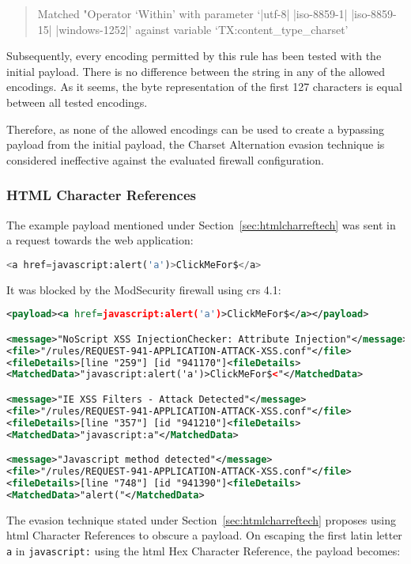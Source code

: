 \begin{quote}
	Matched "Operator `Within' with parameter `|utf-8| |iso-8859-1| |iso-8859-15| |windows-1252|' against variable `TX:content\_type\_charset'
\end{quote}
Subsequently, every encoding permitted by this rule has been tested with the initial payload. There is no difference between the string in any of the allowed encodings. As it seems, the byte representation of the first 127 characters is equal between all tested encodings. \cite{enc/diffa, enc/diffb, enc/diffc}

Therefore, as none of the allowed encodings can be used to create a bypassing payload from the initial payload, the Charset Alternation evasion technique is considered ineffective against the evaluated firewall configuration.


\subsubsection{HTML Character References}
\label{sec:htmlcharrefsingleeva}
The example payload mentioned under Section~\ref{sec:htmlcharreftech} was sent in a request towards the web application:

\begin{lstlisting}[style=basicStyle, language=Python]
<a href=javascript:alert('a')>ClickMeFor$</a>
\end{lstlisting}
It was blocked by the ModSecurity firewall using \acrshort{crs} 4.1:

\begin{lstlisting}[style=ruleStyle, language=XML, caption={<a\ href=javascript:alert('a')>ClickMeFor\$</a> blocked}, label={lst:storedxssinjblocked}]
<payload><a href=javascript:alert('a')>ClickMeFor$</a></payload>

<message>"NoScript XSS InjectionChecker: Attribute Injection"</message>
<file>"/rules/REQUEST-941-APPLICATION-ATTACK-XSS.conf"</file>
<fileDetails>[line "259"] [id "941170"]<fileDetails>
<MatchedData>"javascript:alert('a')>ClickMeFor$<"</MatchedData>

<message>"IE XSS Filters - Attack Detected"</message>
<file>"/rules/REQUEST-941-APPLICATION-ATTACK-XSS.conf"</file>
<fileDetails>[line "357"] [id "941210"]<fileDetails>
<MatchedData>"javascript:a"</MatchedData>

<message>"Javascript method detected"</message>
<file>"/rules/REQUEST-941-APPLICATION-ATTACK-XSS.conf"</file>
<fileDetails>[line "748"] [id "941390"]<fileDetails>
<MatchedData>"alert("</MatchedData>
\end{lstlisting}
The evasion technique stated under Section~\ref{sec:htmlcharreftech} proposes using \acrshort{html} Character References to obscure a payload. 
On escaping the first latin letter \verb|a| in \verb|javascript:| using the \acrshort{html} Hex Character Reference, the payload becomes:

